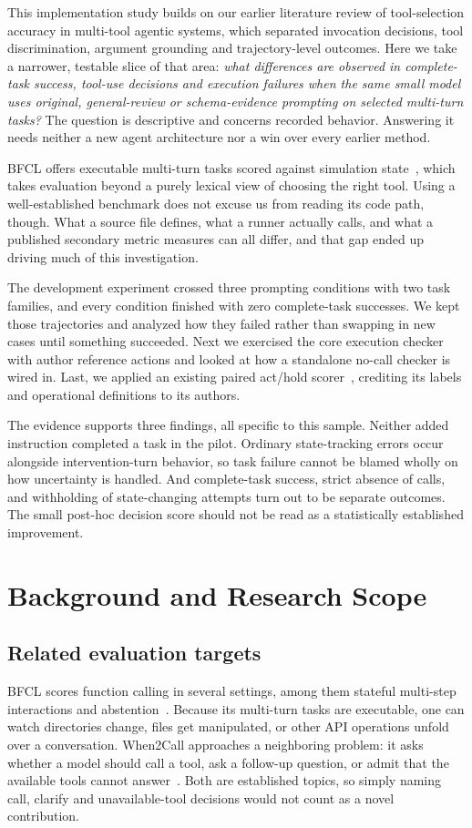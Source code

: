 \documentclass[conference]{IEEEtran}
\begin{document}
This implementation study builds on our earlier literature review of tool-selection accuracy in multi-tool agentic systems, which separated invocation decisions, tool discrimination, argument grounding and trajectory-level outcomes. Here we take a narrower, testable slice of that area: \emph{what differences are observed in complete-task success, tool-use decisions and execution failures when the same small model uses original, general-review or schema-evidence prompting on selected multi-turn tasks?} The question is descriptive and concerns recorded behavior. Answering it needs neither a new agent architecture nor a win over every earlier method.

BFCL offers executable multi-turn tasks scored against simulation state~\cite{patil2025bfcl,gorillacode}, which takes evaluation beyond a purely lexical view of choosing the right tool. Using a well-established benchmark does not excuse us from reading its code path, though. What a source file defines, what a runner actually calls, and what a published secondary metric measures can all differ, and that gap ended up driving much of this investigation.

The development experiment crossed three prompting conditions with two task families, and every condition finished with zero complete-task successes. We kept those trajectories and analyzed how they failed rather than swapping in new cases until something succeeded. Next we exercised the core execution checker with author reference actions and looked at how a standalone no-call checker is wired in. Last, we applied an existing paired act/hold scorer~\cite{liu2026asking}, crediting its labels and operational definitions to its authors.

The evidence supports three findings, all specific to this sample. Neither added instruction completed a task in the pilot. Ordinary state-tracking errors occur alongside intervention-turn behavior, so task failure cannot be blamed wholly on how uncertainty is handled. And complete-task success, strict absence of calls, and withholding of state-changing attempts turn out to be separate outcomes. The small post-hoc decision score should not be read as a statistically established improvement.

\section{Background and Research Scope}
\subsection{Related evaluation targets}
BFCL scores function calling in several settings, among them stateful multi-step interactions and abstention~\cite{patil2025bfcl}. Because its multi-turn tasks are executable, one can watch directories change, files get manipulated, or other API operations unfold over a conversation. When2Call approaches a neighboring problem: it asks whether a model should call a tool, ask a follow-up question, or admit that the available tools cannot answer~\cite{ross2025when2call}. Both are established topics, so simply naming call, clarify and unavailable-tool decisions would not count as a novel contribution.
\end{document}
